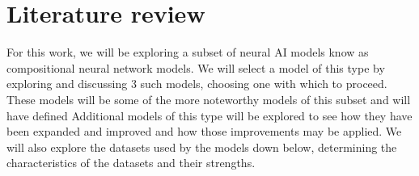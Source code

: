 \chapter{Literature review}
\label{chp:literature_review}

For this work, we will be exploring a subset of neural AI models know as compositional neural network models.
We will select a model of this type by exploring and discussing 3 such models, choosing one with which to proceed.
These models will be some of the more noteworthy models of this subset and will have defined 
Additional models of this type will be explored to see how they have been expanded and improved and how those improvements may be applied.
We will also explore the datasets used by the models down below, determining the characteristics of the datasets and their strengths.


\clearpage


\clearpage


\clearpage


\clearpage
